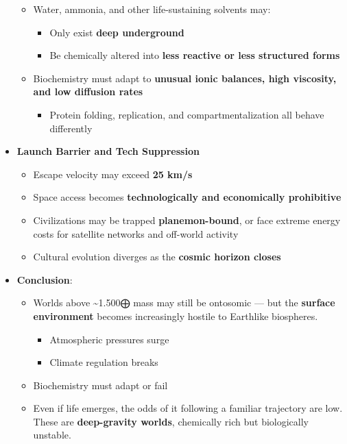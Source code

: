 \documentclass[
  letterpaper,
]{book}
\providecommand{\tightlist}{%
  \setlength{\itemsep}{0pt}\setlength{\parskip}{0pt}}
\begin{document}
\begin{itemize}
  \begin{itemize}
  \tightlist
  \item
    Water, ammonia, and other life-sustaining solvents may:

    \begin{itemize}
    \tightlist
    \item
      Only exist \textbf{deep underground}
    \item
      Be chemically altered into \textbf{less reactive or less
      structured forms}
    \end{itemize}
  \item
    Biochemistry must adapt to \textbf{unusual ionic balances, high
    viscosity, and low diffusion rates}

    \begin{itemize}
    \tightlist
    \item
      Protein folding, replication, and compartmentalization all behave
      differently
    \end{itemize}
  \end{itemize}
\item
  \textbf{Launch Barrier and Tech Suppression}

  \begin{itemize}
  \tightlist
  \item
    Escape velocity may exceed \textbf{25 km/s}
  \item
    Space access becomes \textbf{technologically and economically
    prohibitive}
  \item
    Civilizations may be trapped \textbf{planemon-bound}, or face
    extreme energy costs for satellite networks and off-world activity
  \item
    Cultural evolution diverges as the \textbf{cosmic horizon closes}
  \end{itemize}
\item
  \textbf{Conclusion}:

  \begin{itemize}
  \tightlist
  \item
    Worlds above \textasciitilde1.500⨁ mass may still be ontosomic ---
    but the \textbf{surface environment} becomes increasingly hostile to
    Earthlike biospheres.

    \begin{itemize}
    \tightlist
    \item
      Atmospheric pressures surge
    \item
      Climate regulation breaks
    \end{itemize}
  \item
    Biochemistry must adapt or fail\\
  \item
    Even if life emerges, the odds of it following a familiar trajectory
    are low. These are \textbf{deep-gravity worlds}, chemically rich but
    biologically unstable.
  \end{itemize}
\end{itemize}
\end{document}
